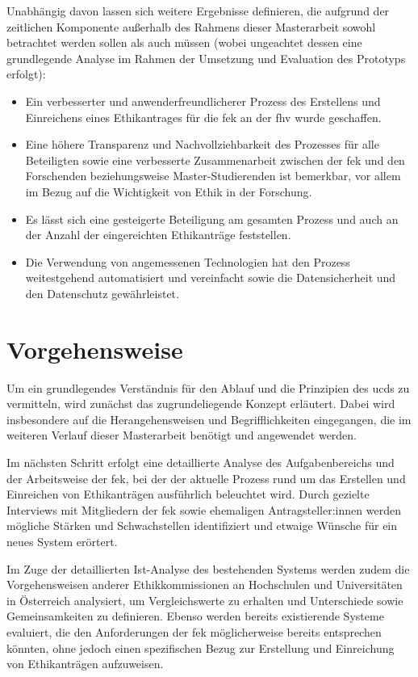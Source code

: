 \documentclass[a4paper,12pt,twoside]{scrreprt}
\begin{document}
Unabhängig davon lassen sich weitere Ergebnisse definieren, die aufgrund der zeitlichen Komponente außerhalb des Rahmens dieser Masterarbeit sowohl betrachtet werden sollen als auch müssen (wobei ungeachtet dessen eine grundlegende Analyse im Rahmen der Umsetzung und Evaluation des Prototyps erfolgt):
\begin{itemize}
    \item Ein verbesserter und anwenderfreundlicherer Prozess des Erstellens und Einreichens eines Ethikantrages für die \acl{fek} an der \acl{fhv} wurde geschaffen.
    \item Eine höhere Transparenz und Nachvollziehbarkeit des Prozesses für alle Beteiligten sowie eine verbesserte Zusammenarbeit zwischen der \acl{fek} und den Forschenden beziehungsweise Master-Studierenden ist bemerkbar, vor allem im Bezug auf die Wichtigkeit von Ethik in der Forschung.
    \item Es lässt sich eine gesteigerte Beteiligung am gesamten Prozess und auch an der Anzahl der eingereichten Ethikanträge feststellen.
    \item Die Verwendung von angemessenen Technologien hat den Prozess weitestgehend automatisiert und vereinfacht sowie die Datensicherheit und den Datenschutz gewährleistet.
\end{itemize}

\section{Vorgehensweise}
\label{sec:vorgehensweise}

Um ein grundlegendes Verständnis für den Ablauf und die Prinzipien des \acl{ucd}s zu vermitteln, wird zunächst das zugrundeliegende Konzept erläutert. Dabei wird insbesondere auf die Herangehensweisen und Begrifflichkeiten eingegangen, die im weiteren Verlauf dieser Masterarbeit benötigt und angewendet werden.

Im nächsten Schritt erfolgt eine detaillierte Analyse des Aufgabenbereichs und der Arbeitsweise der \acl{fek}, bei der der aktuelle Prozess rund um das Erstellen und Einreichen von Ethikanträgen ausführlich beleuchtet wird. Durch gezielte Interviews mit Mitgliedern der \ac{fek} sowie ehemaligen Antragsteller:innen werden mögliche Stärken und Schwachstellen identifiziert und etwaige Wünsche für ein neues System erörtert.

Im Zuge der detaillierten Ist-Analyse des bestehenden Systems werden zudem die Vorgehensweisen anderer Ethikkommissionen an Hochschulen und Universitäten in Österreich analysiert, um Vergleichswerte zu erhalten und Unterschiede sowie Gemeinsamkeiten zu definieren. Ebenso werden bereits existierende Systeme evaluiert, die den Anforderungen der \ac{fek} möglicherweise bereits entsprechen könnten, ohne jedoch einen spezifischen Bezug zur Erstellung und Einreichung von Ethikanträgen aufzuweisen.
\end{document}
